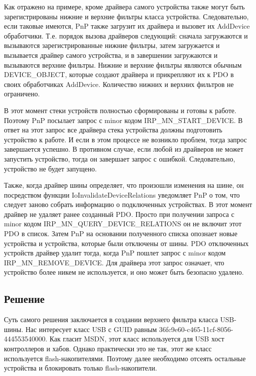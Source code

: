 \documentclass[14pt,a4paper]{article}
\begin{document}
\par Как отражено на примере, кроме драйвера самого устройства также могут быть зарегистрированы нижние и верхние фильтры класса устройства. Следовательно, если таковые имеются, PnP также загрузит их драйвера и вызовет их AddDevice обработчики. Т.е. порядок вызова драйверов следующий: сначала загружаются и вызываются зарегистрированные нижние фильтры, затем загружается и вызывается драйвер самого устройства, и в завершении загружаются и вызываются верхние фильтры. Нижние и верхние фильтры являются обычным DEVICE\_OBJECT, которые создают драйвера и прикрепляют их к PDO в своих обработчиках AddDevice. Количество нижних и верхних фильтров не ограничено.\\

\par В этот момент стеки устройств полностью сформированы и готовы к работе. Поэтому PnP посылает запрос с minor кодом IRP\_MN\_START\_DEVICE. В ответ на этот запрос все драйвера стека устройства должны подготовить устройство к работе. И если в этом процессе не возникло проблем, тогда запрос завершается успешно. В противном случае, если любой из драйверов не может запустить устройство, тогда он завершает запрос с ошибкой. Следовательно, устройство не будет запущено.\\

\par Также, когда драйвер шины определяет, что произошли изменения на шине, он посредством функции IoInvalidateDeviceRelations уведомляет PnP о том, что следует заново собрать информацию о подключенных устройствах. В этот момент драйвер не удаляет ранее созданный PDO. Просто при получении запроса с minor кодом IRP\_MN\_QUERY\_DEVICE\_RELATIONS он не включит этот PDO в список. Затем PnP на основании полученного списка опознает новые устройства и устройства, которые были отключены от шины. PDO отключенных устройств драйвер удалит тогда, когда PnP пошлет запрос с minor кодом IRP\_MN\_REMOVE\_DEVICE. Для драйвера этот запрос означает, что устройство более никем не используется, и оно может быть безопасно удалено.\\

\subsection{Решение}

Суть самого решения заключается в создании верхнего фильтра класса USB-шины. Нас интересует класс USB с GUID равным 36fc9e60-c465-11cf-8056-444553540000. Как гласит MSDN, этот класс используется для USB хост контроллеров и хабов. Однако практически это не так, этот же класс используется flash-накопителями. Поэтому далее необходимо отсеять остальные устройства и блокировать только flash-накопители.
\end{document}
